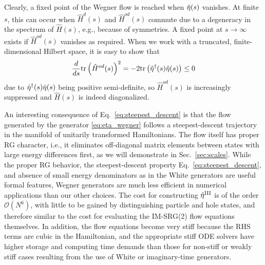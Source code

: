 Clearly, a fixed point of the Wegner flow is reached when $\hat{\eta}(s)$
vanishes. At finite $s$, this can occur when $\hat{H}^d(s)$ and
$\hat{H}^{od}(s)$ commute due to a degeneracy in the spectrum of
$\hat{H}(s)$, e.g., because of symmetries. A fixed point at
$s\to\infty$ exists if $\hat{H}^{od}(s)$ vanishes as required. When we
work with a truncated, finite-dimensional Hilbert space, it is easy to
show that \cite{wegner1994,kehrein2006}
\begin{equation} \label{eq:steepest_descent}
  \totd{}{s}\mathrm{tr}\left(\hat{H}^{od}(s)\right)^2 = -2 \mathrm{tr}\left(\etaO^\dag(s)\etaO(s)\right)\leq 0
\end{equation}
due to $\hat{\eta}^\dag(s)\hat{\eta}(s)$ being positive semi-definite, so $\hat{H}^{od}(s)$ is increasingly suppressed and $\hat{H}(s)$ is indeed diagonalized. 

An interesting consequence of Eq.~\eqref{eq:steepest_descent} is that
the flow generated by the generator \eqref{eq:eta_wegner} follows a
steepest-descent trajectory in the manifold of unitarily transformed
Hamiltonians. The flow itself has proper RG character, i.e., it
eliminates off-diagonal matrix elements between states with large
energy differences first, as we will demonstrate in
Sec.~\ref{sec:scales}. While the proper RG behavior, the
steepest-descent property Eq.~\eqref{eq:steepest_descent}, and absence
of small energy denominators as in the White generators are useful
formal features, Wegner generators are much less efficient in
numerical applications than our other choices. The cost for
constructing $\hat{\eta}^\text{III}$ is of the order $\mathcal{O}(N^6)$,
with little to be gained by distinguishing particle and hole states,
and therefore similar to the cost for evaluating the IM-SRG(2) flow
equations themselves. In addition, the flow equations become very
stiff because the RHS terms are cubic in the Hamiltonian, and the
appropriate stiff ODE solvers have higher storage and computing time
demands than those for non-stiff or weakly stiff cases resulting from
the use of White or imaginary-time generators.


